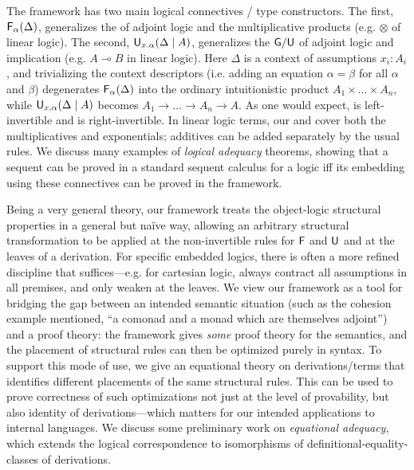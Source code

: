 \documentclass[a4paper,USenglish]{lipics-v2016}
\newcommand\F[2]{\ensuremath{\dsd{F}_{#1}(#2)}}
\newcommand\U[3]{\ensuremath{\dsd{U}_{#1}(#2 \mid #3)}}
\newcommand\lolli\multimap
\begin{document}
The framework has two main logical connectives / type constructors.  The
first, \F{\alpha}{\Delta}, generalizes the  of adjoint logic and
the multiplicative products (e.g. $\otimes$ of linear logic).  The
second, \U{x.\alpha}{\Delta}{A}, generalizes the $\mathsf{G}/\mathsf{U}$ of
adjoint logic and implication (e.g. $A \lolli B$ in linear logic).  Here
$\Delta$ is a context of assumptions $x_i:A_i$, and trivializing the
context descriptors (i.e. adding an equation $\alpha = \beta$ for all
$\alpha$ and $\beta$) degenerates $\F{\alpha}{\Delta}$ into the ordinary
intuitionistic product $A_1 \times \ldots \times A_n$, while
\U{x.\alpha}{\Delta}{A} becomes $A_1 \to \ldots \to A_n \to A$.  
As one would expect,  is left-invertible and  is right-invertible.
In linear logic terms, our  and  cover both the
multiplicatives and exponentials; additives can be added separately by
the usual rules.  We discuss many examples of \emph{logical adequacy}
theorems, showing that a sequent can be proved in a standard sequent
calculus for a logic iff its embedding using these connectives can be
proved in the framework.

Being a very general theory, our framework treats the object-logic
structural properties in a general but na\"ive way, allowing an
arbitrary structural transformation to be applied at the non-invertible
rules for $\mathsf{F}$ and $\mathsf{U}$ and at the leaves of a derivation.
For specific embedded logics, there is often a more refined discipline
that suffices---e.g. for cartesian logic, always contract all
assumptions in all premises, and only weaken at the leaves.  We view our
framework as a tool for bridging the gap between an intended semantic
situation (such as the cohesion example mentioned, ``a comonad and a
monad which are themselves adjoint'') and a proof theory: the framework
gives \emph{some} proof theory for the semantics, and the placement of
structural rules can then be optimized purely in syntax.  To support
this mode of use, we give an equational theory on derivations/terms
that identifies different placements of the same structural rules.  This
can be used to prove correctness of such optimizations not just at the
level of provability, but also identity of derivations---which matters
for our intended applications to internal languages.  We discuss some
preliminary work on \emph{equational adequacy}, which extends the
logical correspondence to isomorphisms of definitional-equality-classes
of derivations.
\end{document}
